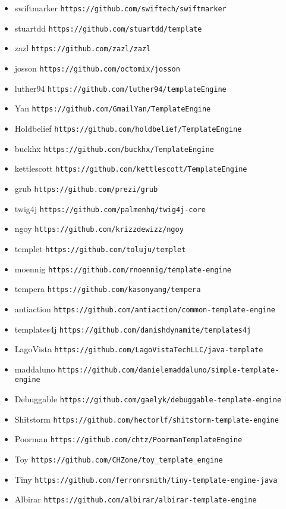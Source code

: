 \begin{singlespace}
\begin{itemize}
\item swiftmarker \verb!https://github.com/swiftech/swiftmarker!
\item stuartdd \verb!https://github.com/stuartdd/template!
\item zazl \verb!https://github.com/zazl/zazl!
\item josson \verb!https://github.com/octomix/josson!
\item luther94 \verb!https://github.com/luther94/templateEngine!
\item Yan \verb!https://github.com/GmailYan/TemplateEngine!
\item Holdbelief \verb!https://github.com/holdbelief/TemplateEngine!
\item buckhx \verb!https://github.com/buckhx/TemplateEngine!
\item kettlescott \verb!https://github.com/kettlescott/TemplateEngine!
\item grub \verb!https://github.com/prezi/grub!
\item twig4j \verb!https://github.com/palmenhq/twig4j-core!
\item ngoy \verb!https://github.com/krizzdewizz/ngoy!
\item templet \verb!https://github.com/toluju/templet!
\item moennig \verb!https://github.com/rnoennig/template-engine!
\item tempera \verb!https://github.com/kasonyang/tempera!
\item antiaction \verb!https://github.com/antiaction/common-template-engine!
\item templates4j \verb!https://github.com/danishdynamite/templates4j!
\item LagoVista \verb!https://github.com/LagoVistaTechLLC/java-template!
\item maddaluno \verb!https://github.com/danielemaddaluno/simple-template-engine!
\item Debuggable \verb!https://github.com/gaelyk/debuggable-template-engine!
\item Shitstorm \verb!https://github.com/hectorlf/shitstorm-template-engine!
\item Poorman \verb!https://github.com/chtz/PoormanTemplateEngine!
\item Toy \verb!https://github.com/CHZone/toy_template_engine!
\item Tiny \verb!https://github.com/ferronrsmith/tiny-template-engine-java!
\item Albirar \verb!https://github.com/albirar/albirar-template-engine!

\end{itemize}
\end{singlespace}
